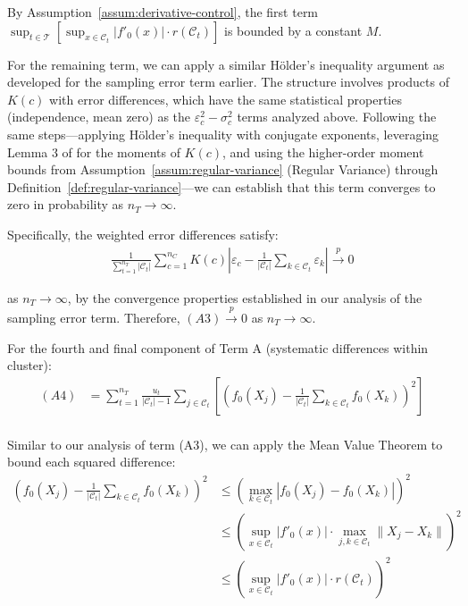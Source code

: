 \documentclass{mytemplate}
\begin{document}
By Assumption~\ref{assum:derivative-control}, the first term $\sup_{t \in \mathcal{T}} [\sup_{x \in \mathcal{C}_t} |f'_0(x)| \cdot r(\mathcal{C}_t)]$ is bounded by a constant $M$. 

For the remaining term, we can apply a similar Hölder's inequality argument as developed for the sampling error term earlier. The structure involves products of $K(c)$ with error differences, which have the same statistical properties (independence, mean zero) as the $\varepsilon_c^2-\sigma_c^2$ terms analyzed above. Following the same steps—applying Hölder's inequality with conjugate exponents, leveraging Lemma 3 of \cite{abadie2006large} for the moments of $K(c)$, and using the higher-order moment bounds from Assumption~\ref{assum:regular-variance} (Regular Variance) through Definition~\ref{def:regular-variance}—we can establish that this term converges to zero in probability as $n_T \to \infty$.

Specifically, the weighted error differences satisfy:
\begin{align*}
\frac{1}{\sum_{t=1}^{n_T}|\mathcal{C}_t|} \sum_{c=1}^{n_C} K(c) \left|\varepsilon_c - \frac{1}{|\mathcal{C}_t|} \sum_{k \in \mathcal{C}_t} \varepsilon_k\right| \xrightarrow{p} 0
\end{align*}

as $n_T \to \infty$, by the convergence properties established in our analysis of the sampling error term. Therefore, $(A3) \xrightarrow{p} 0$ as $n_T \to \infty$.


For the fourth and final component of Term A (systematic differences within cluster):
\begin{align*}
(A4) &= \sum_{t=1}^{n_T} \frac{u_t}{|\mathcal{C}_t|-1} \sum_{j \in \mathcal{C}_t} \left[\left(f_0(X_j) - \frac{1}{|\mathcal{C}_t|} \sum_{k \in \mathcal{C}_t} f_0(X_k) \right)^2 \right] \\
\end{align*}

Similar to our analysis of term (A3), we can apply the Mean Value Theorem to bound each squared difference:
\begin{align*}
\left(f_0(X_j) - \frac{1}{|\mathcal{C}_t|} \sum_{k \in \mathcal{C}_t} f_0(X_k) \right)^2 &\leq \left(\max_{k \in \mathcal{C}_t} |f_0(X_j) - f_0(X_k)|\right)^2 \\
&\leq \left(\sup_{x \in \mathcal{C}_t} |f'_0(x)| \cdot \max_{j,k \in \mathcal{C}_t} \|X_j - X_k\|\right)^2 \\
&\leq \left(\sup_{x \in \mathcal{C}_t} |f'_0(x)| \cdot r(\mathcal{C}_t)\right)^2
\end{align*}
\end{document}
